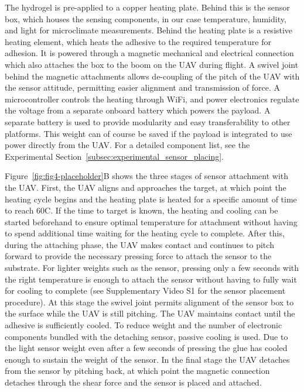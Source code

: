 The hydrogel is pre-applied to a copper heating plate. Behind this is the sensor box, which houses the sensing components, in our case temperature, humidity, and light for microclimate measurements. Behind the heating plate is a resistive heating element, which heats the adhesive to the required temperature for adhesion. It is powered through a magnetic mechanical and electrical connection which also attaches the box to the boom on the UAV during flight. A swivel joint behind the magnetic attachments allows de-coupling of the pitch of the UAV with the sensor attitude, permitting easier alignment and transmission of force. A microcontroller controls the heating through WiFi, and power electronics regulate the voltage from a separate onboard battery which powers the payload. A separate battery is used to provide modularity and easy transferability to other platforms. This weight can of course be saved if the payload is integrated to use power directly from the UAV. For a detailed component list, see the Experimental Section~\ref{subsec:experimental_sensor_placing}. 

Figure~\ref{fig:fig4-placeholder}B shows the three stages of sensor attachment with the UAV. First, the UAV aligns and approaches the target, at which point the heating cycle begins and the heating plate is heated for a specific amount of time to reach 60\degree C. If the time to target is known, the heating and cooling can be started beforehand to ensure optimal temperature for attachment without having to spend additional time waiting for the heating cycle to complete. After this, during the attaching phase, the UAV makes contact and continues to pitch forward to provide the necessary pressing force to attach the sensor to the substrate. For lighter weights such as the sensor, pressing only a few seconds with the right temperature is enough to attach the sensor without having to fully wait for cooling to complete (see Supplementary Video S1 for the sensor placement procedure). At this stage the swivel joint permits alignment of the sensor box to the surface while the UAV is still pitching. The UAV maintains contact until the adhesive is sufficiently cooled. To reduce weight and the number of electronic components bundled with the detaching sensor, passive cooling is used. Due to the light sensor weight even after a few seconds of pressing the glue has cooled enough to sustain the weight of the sensor. In the final stage the UAV detaches from the sensor by pitching back, at which point the magnetic connection detaches through the shear force and the sensor is placed and attached. 

